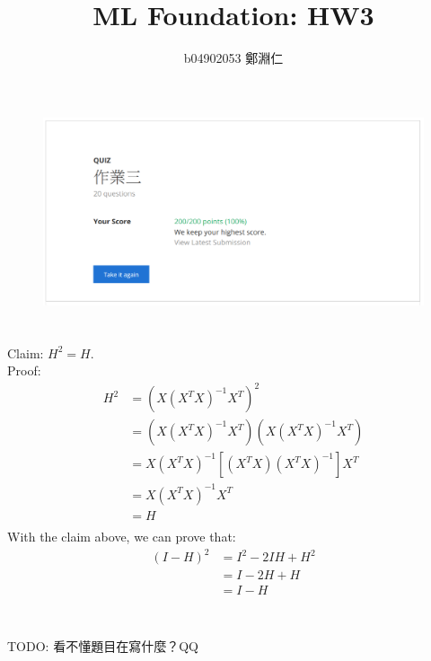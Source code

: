 \documentclass[12pt,a4paper]{article}
\title{ML Foundation: HW3}
\author{b04902053 鄭淵仁}
\begin{document}
\maketitle
\section{} %
\begin{figure}[h!]
	\centering
	\includegraphics[width=\linewidth]{code/q1.png}
\end{figure}
\section{} %
Claim: ${H}^{2} = H$. \\
Proof:
\[
	\begin{aligned}
		{H}^{2} &= {(X {({X}^{T}X)}^{-1} {X}^{T})} ^ {2} \\
				&= (X {({X}^{T}X)}^{-1} {X}^{T}) (X {({X}^{T}X)}^{-1} {X}^{T}) \\
				&= X {({X}^{T}X)}^{-1} [ ({X}^{T} X) {({X}^{T}X)}^{-1} ] {X}^{T} \\
				&= X {({X}^{T}X)}^{-1} {X}^{T} \\
				&= H \\
	\end{aligned}
\]
With the claim above, we can prove that:
\[
	\begin{aligned}
		{(I-H)}^{2} &= {I}^{2} - 2IH + {H}^{2} \\
					&= I - 2H + H \\
					&= I - H \\
	\end{aligned}
\]
\section{} %
TODO: 看不懂題目在寫什麼？QQ
\end{document}
